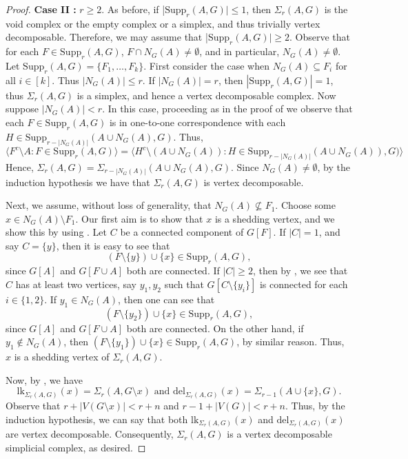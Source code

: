 \documentclass[12pt,reqno]{amsart}
\theoremstyle{definition}
\newcommand{\lk}{{\mathrm{lk}}}
\newcommand{\del}{{\mathrm{del}}}
\newcommand{\Supp}{\mathrm{Supp}}
\def\del{\mathrm{del}}
\def\SrAG{\Sigma_r(A,G)}
\begin{document}
\begin{proof}
		\medskip
		\noindent
		\textbf{Case II :} $r\ge 2$. As before, if |$\Supp_r(A,G)| \le 1$, then $\SrAG$ is the void complex or the empty complex or a simplex, and thus trivially vertex decomposable. Therefore, we may assume that |$\Supp_r(A,G)| \ge 2$. Observe that for each $F\in\Supp_r(A,G)$, $F\cap N_G(A)\neq\emptyset$, and in particular, $N_G(A)\neq\emptyset$. Let $\Supp_r(A,G)=\{F_1,\ldots,F_k\}$. First consider the case when $N_G(A)\subseteq F_i$ for all $i\in[k]$. Thus $|N_G(A)|\le r$. If $|N_G(A)|=r$, then $|\Supp_r(A,G)|=1$, thus $\SrAG$ is a simplex, and hence a vertex decomposable complex. Now suppose $|N_G(A)|<r$. In this case, proceeding as in the proof of  we observe that each $F\in\Supp_r(A,G)$ is in one-to-one correspondence with each $H\in \Supp_{r-|N_G(A)|}(A\cup N_G(A),G)$. Thus, 
		\[\langle F^{c} \setminus A : F \in \mathrm{Supp}_r(A,G) \rangle = \langle H^{c} \setminus (A \cup N_G(A)): H \in \mathrm{Supp}_{r-|N_G(A)|}(A \cup N_G(A)),G)\rangle \] 
		Hence, $\SrAG=\Sigma_{r-|N_G(A)|}(A\cup N_G(A),G)$. Since $N_G(A)\neq\emptyset$, by the induction hypothesis we have that $\SrAG$ is vertex decomposable.
		
		Next, we assume, without loss of generality, that $N_G(A)\not\subseteq F_1$. Choose some $x\in N_G(A)\setminus F_1$. Our first aim is to show that $x$ is a shedding vertex, and we show this by using . Let $C$ be a connected component of $G[F]$. If $|C|=1$, and say $C=\{y\}$, then it is easy to see that 
        \[(F \setminus \{y\}) \cup \{x\} \in \mathrm{Supp}_r(A,G),\]
        since $G[A]$ and $G[F\cup A]$ both are connected. If $|C|\ge 2$, then by , we see that $C$ has at least two vertices, say $y_1,y_2$ such that $G[C\setminus\{y_i\}]$ is connected for each $i\in\{1,2\}$. If $y_1\in N_G(A)$, then one can see that 
        \[
        (F \setminus \{y_2\}) \cup \{x\} \in \mathrm{Supp}_r(A,G),
        \]
        since $G[A]$ and $G[F\cup A]$ both are connected. On the other hand, if $y_1\notin N_G(A)$, then  $(F \setminus \{y_1\}) \cup \{x\} \in \mathrm{Supp}_r(A,G)$, by similar reason. Thus, $x$ is a shedding vertex of $\SrAG$. 
		
		Now, by , we have
		\[
		\lk_{\Sigma_r(A,G)}(x) = \Sigma_r(A,G \setminus x) \text{  and  }\del_{\Sigma_r(A,G)}(x) = \Sigma_{r-1}(A \cup \{x\},G).
		\] 
		Observe that $r+|V(G\setminus x)|<r+n$ and $r-1+|V(G)|<r+n$. Thus, by the induction hypothesis, we can say that both $\lk_{\Sigma_r(A, G)}(x)$ and $\del_{\Sigma_r(A,G)}(x)$ are vertex decomposable. Consequently, $\SrAG$ is a vertex decomposable simplicial complex, as desired. 
	\end{proof}
\end{document}
